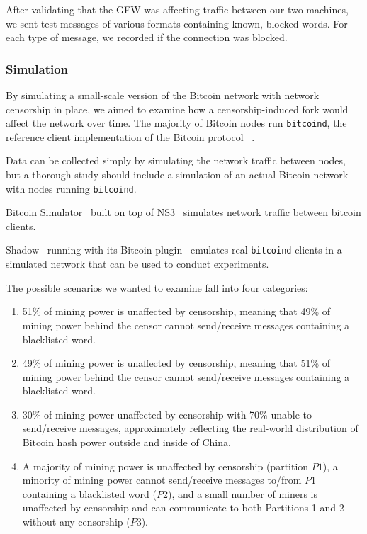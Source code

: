 After validating that the GFW was affecting traffic between our two machines, we sent test messages of various formats containing known, blocked words. For each type of message, we recorded if the connection was blocked.

\subsubsection{Simulation}
By simulating a small-scale version of the Bitcoin network with network censorship in place, we aimed to examine how a censorship-induced fork would affect the network over time. The majority of Bitcoin nodes run \texttt{bitcoind}, the reference client implementation of the Bitcoin protocol ~\cite{shadow-bitcoin}.

Data can be collected simply by simulating the network traffic between nodes, but a thorough study should include a simulation of an actual Bitcoin network with nodes running \texttt{bitcoind}.

Bitcoin Simulator~\cite{bitcoin-simulator} built on top of NS3~\cite{NS3} simulates network traffic between bitcoin clients. %

Shadow~\cite{shadow} running with its Bitcoin plugin~\cite{shadow-bitcoin} emulates real \texttt{bitcoind} clients in a simulated network that can be used to conduct experiments.

The possible scenarios we wanted to examine fall into four categories:
\begin{enumerate}
\item 51\% of mining power is unaffected by censorship, meaning that 49\% of mining power behind the censor cannot send/receive messages containing a blacklisted word.
\item 49\% of mining power is unaffected by censorship, meaning that 51\% of mining power behind the censor cannot send/receive messages containing a blacklisted word.
\item 30\% of mining power unaffected by censorship with 70\% unable to send/receive messages, approximately reflecting the real-world distribution of Bitcoin hash power outside and inside of China.
\item A majority of mining power is unaffected by censorship (partition $P1$), a minority of mining power cannot send/receive messages to/from $P1$ containing a blacklisted word ($P2$), and a small number of miners is unaffected by censorship and can communicate to both Partitions 1 and 2 without any censorship ($P3$).
\end{enumerate}
